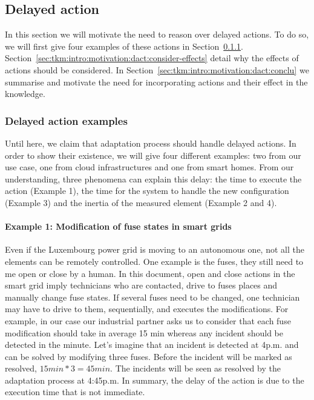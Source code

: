 \subsection{Delayed action}

In this section we will motivate the need to reason over delayed actions.
To do so, we will first give four examples of these actions in Section~\ref{sec:tkm:intro:motivation:dact:examples}.
Section~\ref{sec:tkm:intro:motivation:dact:consider-effects} detail why the effects of actions should be considered.
In Section~\ref{sec:tkm:intro:motivation:dact:conclu} we summarise and motivate the need for incorporating actions and their effect in the knowledge. 

\subsubsection{Delayed action examples}
\label{sec:tkm:intro:motivation:dact:examples}

Until here, we claim that adaptation process should handle delayed actions.
In order to show their existence, we will give four different examples: two from our use case, one from cloud infrastructures and one from smart homes.
From our understanding, three phenomena can explain this delay: the time to execute the action (\cf Example 1), the time for the system to handle the new configuration (\cf Example 3) and the inertia of the measured element (\cf Example 2 and 4).

\paragraph{Example 1: Modification of fuse states in smart grids}
Even if the Luxembourg power grid is moving to an autonomous one, not all the elements can be remotely controlled.
One example is the fuses, they still need to me open or close by a human.
In this document, open and close actions in the smart grid imply technicians who are contacted, drive to fuses places and manually change fuse states.
If several fuses need to be changed, one technician may have to drive to them, sequentially, and executes the modifications.
For example, in our case our industrial partner asks us to consider that each fuse modification should take in average 15 min whereas any incident should be detected in the minute.
Let's imagine that an incident is detected at 4p.m. and can be solved by modifying three fuses.
Before the incident will be marked as resolved, $15min * 3 = 45min$. 
The incidents will be seen as resolved by the adaptation process at 4:45p.m.
In summary, the delay of the action is due to the execution time that is not immediate.

